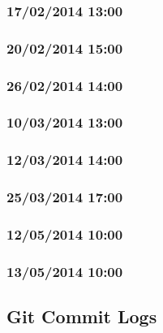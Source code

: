 \documentclass[a4paper,11pt]{article}
\begin{document}
\subsubsection{17/02/2014 13:00}

\clearpage
\subsubsection{20/02/2014 15:00}

\clearpage
\subsubsection{26/02/2014 14:00}

\clearpage
\subsubsection{10/03/2014 13:00}

\clearpage
\subsubsection{12/03/2014 14:00}

\clearpage
\subsubsection{25/03/2014 17:00}

\clearpage
\subsubsection{12/05/2014 10:00}

\clearpage
\subsubsection{13/05/2014 10:00}

\lstset{breaklines=false}
\clearpage


\begin{landscape}
\subsection{Git Commit Logs}
\lstset{breaklines=true}

\clearpage
\end{landscape}
\end{document}
